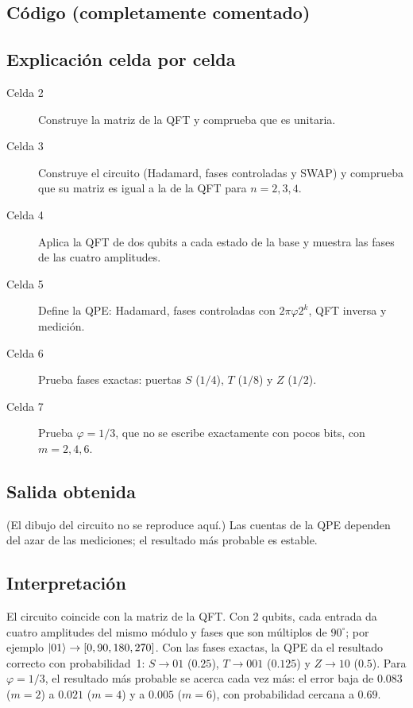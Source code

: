 \subsection{Código (completamente comentado)}


\subsection{Explicación celda por celda}
\begin{description}
  \item[Celda 2] Construye la matriz de la QFT y comprueba que es unitaria.
  \item[Celda 3] Construye el circuito (Hadamard, fases controladas y SWAP) y
    comprueba que su matriz es igual a la de la QFT para $n=2,3,4$.
  \item[Celda 4] Aplica la QFT de dos qubits a cada estado de la base y muestra
    las fases de las cuatro amplitudes.
  \item[Celda 5] Define la QPE: Hadamard, fases controladas con
    $2\pi\varphi2^k$, QFT inversa y medición.
  \item[Celda 6] Prueba fases exactas: puertas $S$ ($1/4$), $T$ ($1/8$) y $Z$
    ($1/2$).
  \item[Celda 7] Prueba $\varphi=1/3$, que no se escribe exactamente con pocos
    bits, con $m=2,4,6$.
\end{description}

\subsection{Salida obtenida}

(El dibujo del circuito no se reproduce aquí.) Las cuentas de la QPE dependen
del azar de las mediciones; el resultado más probable es estable.

\subsection{Interpretación}
El circuito coincide con la matriz de la QFT. Con 2 qubits, cada entrada da
cuatro amplitudes del mismo módulo y fases que son múltiplos de $90^\circ$; por
ejemplo $\left|01\right\rangle\to[0,90,180,270]$. Con las fases exactas, la QPE da el
resultado correcto con probabilidad~1: $S\to01$ ($0.25$), $T\to001$ ($0.125$)
y $Z\to10$ ($0.5$). Para $\varphi=1/3$, el resultado más probable se acerca
cada vez más: el error baja de $0.083$ ($m=2$) a $0.021$ ($m=4$) y a $0.005$
($m=6$), con probabilidad cercana a $0.69$.

